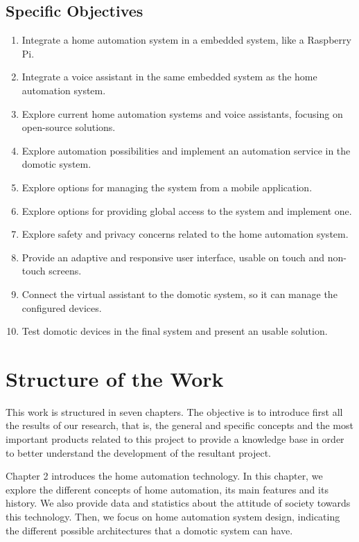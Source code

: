 \subsection{Specific Objectives}
\begin{enumerate}
	\item Integrate a home automation system in a embedded system, like a Raspberry Pi.
	\item Integrate a voice assistant in the same embedded system as the home automation system.
	\item Explore current home automation systems and voice assistants, focusing on open-source solutions.
	\item Explore automation possibilities and implement an automation service in the domotic system.
	\item Explore options for managing the system from a mobile application.
	\item Explore options for providing global access to the system and implement one.
	\item Explore safety and privacy concerns related to the home automation system.
	\item Provide an adaptive and responsive user interface, usable on touch and non-touch screens.
	\item Connect the virtual assistant to the domotic system, so it can manage the configured devices.
	\item Test domotic devices in the final system and present an usable solution.
\end{enumerate}

\section{Structure of the Work}
This work is structured in seven chapters. The objective is to introduce first all the results of our research, that is, the general
and specific concepts and the most important products related to this project to provide a knowledge base in order to better
understand the development of the resultant project.

Chapter 2 introduces the home automation technology. In this chapter, we explore the different concepts of home automation,
its main features and its history. We also provide data and statistics about the attitude of society towards this technology. Then,
we focus on home automation system design, indicating the different possible architectures that a domotic system can have.

